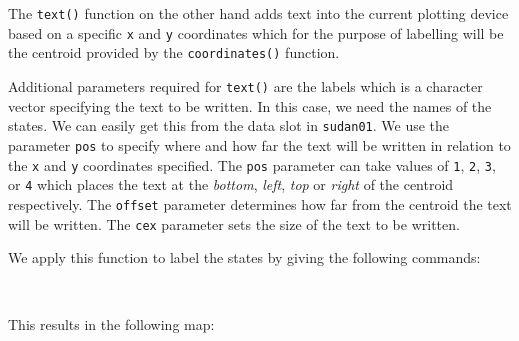 \documentclass[12pt,a4paper,a4paper]{book}
\newenvironment{Shaded}{\begin{snugshade}}{\end{snugshade}}
\newcommand{\KeywordTok}[1]{\textcolor[rgb]{0.13,0.29,0.53}{\textbf{#1}}}
\newcommand{\DataTypeTok}[1]{\textcolor[rgb]{0.13,0.29,0.53}{#1}}
\newcommand{\DecValTok}[1]{\textcolor[rgb]{0.00,0.00,0.81}{#1}}
\newcommand{\FloatTok}[1]{\textcolor[rgb]{0.00,0.00,0.81}{#1}}
\newcommand{\StringTok}[1]{\textcolor[rgb]{0.31,0.60,0.02}{#1}}
\newcommand{\OperatorTok}[1]{\textcolor[rgb]{0.81,0.36,0.00}{\textbf{#1}}}
\newcommand{\NormalTok}[1]{#1}
\theoremstyle{definition}
\theoremstyle{definition}
\theoremstyle{definition}
\theoremstyle{remark}
\begin{document}
The \texttt{text()} function on the other hand adds text into the
current plotting device based on a specific \texttt{x} and \texttt{y}
coordinates which for the purpose of labelling will be the centroid
provided by the \texttt{coordinates()} function.

Additional parameters required for \texttt{text()} are the labels which
is a character vector specifying the text to be written. In this case,
we need the names of the states. We can easily get this from the data
slot in \texttt{sudan01}. We use the parameter \texttt{pos} to specify
where and how far the text will be written in relation to the \texttt{x}
and \texttt{y} coordinates specified. The \texttt{pos} parameter can
take values of \texttt{1}, \texttt{2}, \texttt{3}, or \texttt{4} which
places the text at the \emph{bottom}, \emph{left}, \emph{top} or
\emph{right} of the centroid respectively. The \texttt{offset} parameter
determines how far from the centroid the text will be written. The
\texttt{cex} parameter sets the size of the text to be written.

We apply this function to label the states by giving the following
commands:

~

\begin{Shaded}
\end{Shaded}

\newpage

This results in the following map:

~
\end{document}
